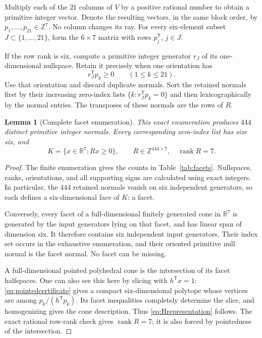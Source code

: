 \documentclass[11pt]{article}
\newtheorem{lemma}[theorem]{Lemma}
\theoremstyle{definition}
\newcommand{\R}{\mathbb R}
\newcommand{\Z}{\mathbb Z}
\newcommand{\rank}{\operatorname{rank}}
\newcommand{\trans}{^{\mathsf T}}
\numberwithin{equation}{section}
\begin{document}
Multiply each of the $21$ columns of $V$ by a positive rational number to
obtain a primitive integer vector. Denote the resulting vectors, in the
same block order, by $p_1,\ldots,p_{21}\in\Z^7$. No column changes its ray.
For every six-element subset $J\subset\{1,\ldots,21\}$, form the
$6\times7$ matrix with rows $p_j\trans$, $j\in J$.

If the row rank is six, compute a primitive integer generator $r_J$ of its
one-dimensional nullspace. Retain it precisely when one orientation has
\begin{equation}\label{eq:facetcriterion}
 r_J\trans p_k\geq0\qquad(1\leq k\leq21).
\end{equation}
Use that orientation and discard duplicate normals. Sort the retained
normals first by their increasing zero-index lists
$\{k:r_J\trans p_k=0\}$ and then lexicographically by the normal entries.
The transposes of these normals are the rows of $R$.

\begin{lemma}[Complete facet enumeration]\label{lem:facets}
This exact enumeration produces $444$ distinct primitive integer normals.
Every corresponding zero-index list has size six, and
\begin{equation}\label{eq:Hrepresentation}
 K=\{x\in\R^7:Rx\geq0\},\qquad
 R\in\Z^{444\times7},\quad \rank R=7.
\end{equation}
\end{lemma}

\begin{proof}
The finite enumeration gives the counts in Table~\ref{tab:facets}.
Nullspaces, ranks, orientations, and all supporting signs are calculated
using exact integers. In particular, the $444$ retained normals vanish on
six independent generators, so each defines a six-dimensional face of
$K$: a facet.

Conversely, every facet of a full-dimensional finitely generated cone in
$\R^7$ is generated by the input generators lying on that facet, and has
linear span of dimension six. It therefore contains six independent input
generators. Their index set occurs in the exhaustive enumeration, and
their oriented primitive null normal is the facet normal. No facet can be
missing.

A full-dimensional pointed polyhedral cone is the intersection of its
facet halfspaces. One can also see this here by slicing with $h\trans x=1$:
\eqref{eq:pointedcertificate} gives a compact six-dimensional polytope whose
vertices are among $p_k/(h\trans p_k)$. Its facet inequalities completely
determine the slice, and homogenizing gives the cone description. Thus
\eqref{eq:Hrepresentation} follows. The exact rational row-rank check gives
$\rank R=7$; it is also forced by pointedness of the intersection.
\end{proof}
\end{document}
